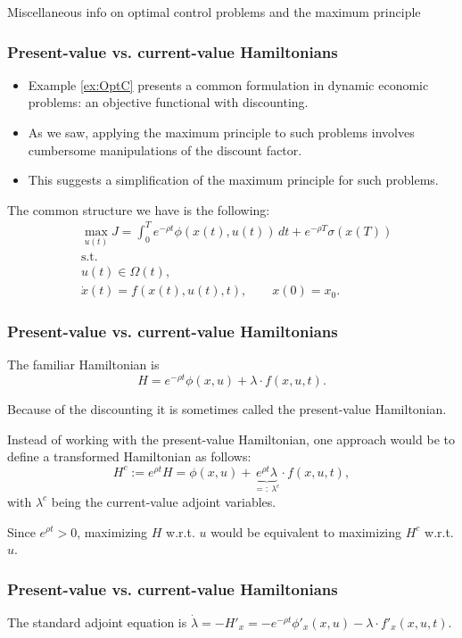 \documentclass[10pt]{beamer}
\theoremstyle{definition}
\begin{document}
\begin{section}{Miscellaneous info on optimal control problems and the maximum principle}\label{sec:misc}

\begin{frame}[fragile]
\frametitle{Present-value vs. current-value Hamiltonians}
\begin{itemize}
\item Example \ref{ex:OptC} presents a common formulation in dynamic economic problems: an objective functional with discounting.
\item As we saw, applying the maximum principle to such problems involves cumbersome manipulations of the discount factor.
\item This suggests a simplification of the maximum principle for such problems.
\end{itemize}\bigskip

The common structure we have is the following:
\begin{equation*}
\begin{split}
& \max_{u(t)} J = \int_{0}^{T}e^{-\rho t}\phi(x(t),u(t))\,dt + e^{-\rho T}\sigma (x(T)) \\
&\text{s.t.}\\
& u(t)\in \Omega(t) ,\\
& \dot{x}(t)=f(x(t),u(t),t),\qquad x(0)=x_0.
\end{split}
\end{equation*}
\end{frame}

\begin{frame}[fragile]
\frametitle{Present-value vs. current-value Hamiltonians}
The familiar Hamiltonian is \[  H = e^{-\rho t}\phi(x,u) + \lambda \cdot f(x,u,t) . \]

Because of the discounting it is sometimes called the present-value Hamiltonian.\bigskip

Instead of working with the present-value Hamiltonian, one approach would be to define a transformed Hamiltonian as follows:
\[ H^c := e^{\rho t}H = \phi (x,u)+ \underbrace{e^{\rho t} \lambda}_{=:~ \lambda^c} \cdot f(x,u,t), \] with $ \lambda^c $ being the current-value adjoint variables.

Since $ e^{\rho t} > 0 $, maximizing $ H $ w.r.t. $ u $ would be equivalent to maximizing $ H^c $ w.r.t. $ u $.
\end{frame}

\begin{frame}[fragile]
\frametitle{Present-value vs. current-value Hamiltonians}
The standard adjoint equation is $ \dot{\lambda} = -H'_x =  -e^{-\rho t}\phi'_x(x,u) - \lambda \cdot f'_x(x,u,t) $.\bigskip


\end{frame}
\end{section}
\end{document}
